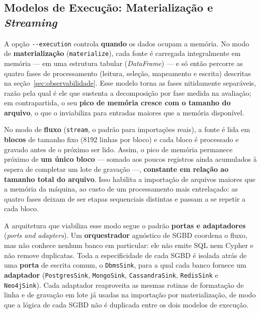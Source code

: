 \subsection{Modelos de Execução: Materialização e \textit{Streaming}}
\label{sec:modelos-execucao}

A opção \texttt{-{}-execution} controla \textbf{quando} os dados ocupam a memória. No modo
de \textbf{materialização} (\texttt{materialize}), cada fonte é carregada integralmente em
memória --- em uma estrutura tabular (\textit{DataFrame}) --- e só então percorre as quatro
fases de processamento (leitura, seleção, mapeamento e escrita) descritas na
seção~\ref{sec:observabilidade}. Esse modelo torna as fases nitidamente separáveis, razão
pela qual é ele que sustenta a decomposição por fase medida na avaliação; em contrapartida,
o seu \textbf{pico de memória cresce com o tamanho do arquivo}, o que o inviabiliza para
entradas maiores que a memória disponível.

No modo de \textbf{fluxo} (\texttt{stream}, o padrão para importações reais), a fonte é
lida em \textbf{blocos} de tamanho fixo (8192 linhas por bloco) e cada bloco é processado e
gravado antes de o próximo ser lido. Assim, o pico de memória permanece próximo de
\textbf{um único bloco} --- somado aos poucos registros ainda acumulados à espera de
completar um lote de gravação ---, \textbf{constante em relação ao tamanho total do
arquivo}. Isso habilita a importação de arquivos maiores que a memória da máquina, ao custo
de um processamento mais entrelaçado: as quatro fases deixam de ser etapas sequenciais
distintas e passam a se repetir a cada bloco.

A arquitetura que viabiliza esse modo segue o padrão \textbf{portas e adaptadores}
(\textit{ports and adapters}). Um \textbf{orquestrador} agnóstico de SGBD coordena o fluxo,
mas não conhece nenhum banco em particular: ele não emite SQL nem Cypher e não remove
duplicatas. Toda a especificidade de cada SGBD é isolada atrás de uma \textbf{porta} de
escrita comum, o \texttt{DbmsSink}, para a qual cada banco fornece um \textbf{adaptador}
(\texttt{PostgresSink}, \texttt{MongoSink}, \texttt{CassandraSink}, \texttt{RedisSink} e
\texttt{Neo4jSink}). Cada adaptador reaproveita as mesmas rotinas de formatação de linha e
de gravação em lote já usadas na importação por materialização, de modo que a lógica de
cada SGBD não é duplicada entre os dois modelos de execução.

